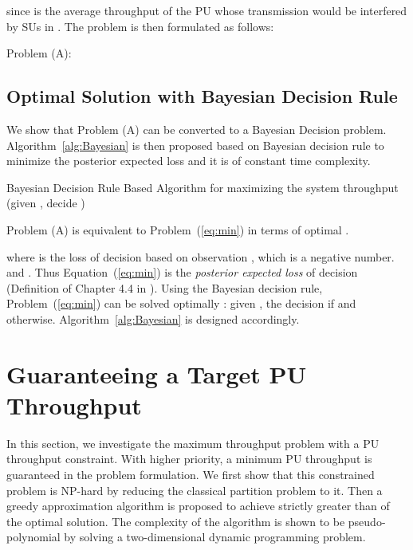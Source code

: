 \documentclass[conference]{IEEEtran}
\begin{document}
since  is the average throughput of the PU whose transmission would be interfered by SUs in . The problem is then formulated as follows:

Problem (A):


\subsection{Optimal Solution with Bayesian Decision Rule}
\label{subsec:Bayesian_max}

We show that Problem (A) can be converted to a Bayesian Decision problem. Algorithm~\ref{alg:Bayesian} is then proposed based on Bayesian decision rule to minimize the posterior expected loss \cite{Berger} and it is of constant time complexity.

\begin{algorithm}[t]
    \caption{{\footnotesize Bayesian Decision Rule Based Algorithm for maximizing the system throughput (given , decide )}}\label{alg:Bayesian}
    \begin{algorithmic}[1]
	{\footnotesize \IF{}
		\STATE 
	\ELSE
		\STATE 
	\ENDIF}
    \end{algorithmic}
    \vspace{-0.2em}
\end{algorithm}

Problem (A) is equivalent to Problem~(\ref{eq:min}) in terms of optimal . \vspace{-1em}

\vspace{-0.5em}

where  is the loss of decision  based on observation , which is a negative number.  and . Thus Equation~(\ref{eq:min}) is the \emph{posterior expected loss} of decision  (Definition  of Chapter 4.4 in \cite{Berger}). Using the Bayesian decision rule, Problem~(\ref{eq:min}) can be solved optimally \cite{Berger}: given , the decision  if  and  otherwise. Algorithm~\ref{alg:Bayesian} is designed accordingly.   

\section{Guaranteeing a Target PU Throughput}
\label{sec:PU_thru}
In this section, we investigate the maximum throughput problem with a PU throughput constraint. With higher priority, a minimum PU throughput is guaranteed in the problem formulation. We first show that this constrained problem is NP-hard by reducing the classical partition problem \cite{Garey} to it. Then a greedy approximation algorithm is proposed to achieve strictly greater than  of the optimal solution. The complexity of the algorithm is shown to be pseudo-polynomial by solving a two-dimensional dynamic programming problem. 
\end{document}
